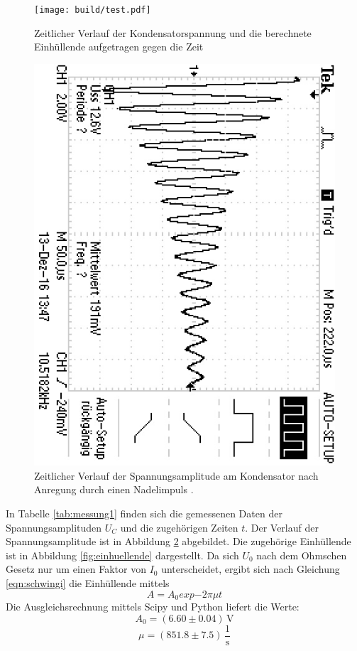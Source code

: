 \begin{figure}
	\centering
	\texttt{[image: build/test.pdf]}
	\caption{Zeitlicher Verlauf der Kondensatorspannung und die berechnete Einhüllende aufgetragen gegen die Zeit}
	\label{fig:einhüllende}
\end{figure}
\begin{figure}
	\includegraphics{Bilder/a)correct/F0002TEK.JPG}
	\caption{Zeitlicher Verlauf der Spannungsamplitude am Kondensator nach Anregung durch einen Nadelimpuls .}
	\label{fig:spannungsamplitude}
\end{figure}
In Tabelle \ref{tab:messung1} finden sich die gemessenen Daten der Spannungsamplituden $U_C$ und die zugehörigen Zeiten $t$.
Der Verlauf der Spannungsamplitude ist in Abbildung \ref{fig:spannungsamplitude} abgebildet. Die zugehörige Einhüllende ist in Abbildung \ref{fig:einhuellende} dargestellt.
Da sich $U_\text{0}$ nach dem Ohmschen Gesetz nur um einen Faktor von $I_\text{0}$ unterscheidet, ergibt sich nach Gleichung \eqref{eqn:schwingi} die Einhüllende mittels
\begin{equation}
	A=A_\text{0}exp{-2 \pi \mu t}
\end{equation}
Die Ausgleichsrechnung mittels Scipy und Python liefert die Werte:
\begin{equation*}
	A_0 =  (6.60 \pm 0.04) \,\si{\volt}
\end{equation*}
\begin{equation*}
	\mu =  (851.8 \pm 7.5) \, \frac{1}{\si{\second}}
\end{equation*}

